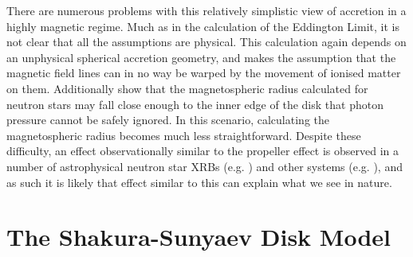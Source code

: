 \par There are numerous problems with this relatively simplistic view of accretion in a highly magnetic regime.  Much as in the calculation of the Eddington Limit, it is not clear that all the assumptions are physical.  This calculation again depends on an unphysical spherical accretion geometry, and makes the assumption that the magnetic field lines can in no way be warped by the movement of ionised matter on them.  Additionally \citet{White_MRad} show that the magnetospheric radius calculated for neutron stars may fall close enough to the inner edge of the disk that photon pressure cannot be safely ignored.  In this scenario, calculating the magnetospheric radius becomes much less straightforward.  Despite these difficulty, an effect observationally similar to the propeller effect is observed in a number of astrophysical neutron star XRBs (e.g. \citealp{Fabian_Propex,Furst_Propex}) and other systems (e.g. \citep{Campana_PropBorder}), and as such it is likely that effect similar to this can explain what we see in nature.

\section{The Shakura-Sunyaev Disk Model}

